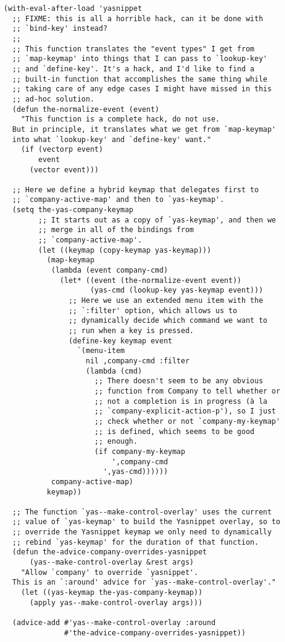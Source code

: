 \documentclass[11pt]{article}
\begin{document}
\begin{verbatim}
(with-eval-after-load 'yasnippet
  ;; FIXME: this is all a horrible hack, can it be done with
  ;; `bind-key' instead?
  ;;
  ;; This function translates the "event types" I get from
  ;; `map-keymap' into things that I can pass to `lookup-key'
  ;; and `define-key'. It's a hack, and I'd like to find a
  ;; built-in function that accomplishes the same thing while
  ;; taking care of any edge cases I might have missed in this
  ;; ad-hoc solution.
  (defun the-normalize-event (event)
    "This function is a complete hack, do not use.
  But in principle, it translates what we get from `map-keymap'
  into what `lookup-key' and `define-key' want."
    (if (vectorp event)
        event
      (vector event)))

  ;; Here we define a hybrid keymap that delegates first to
  ;; `company-active-map' and then to `yas-keymap'.
  (setq the-yas-company-keymap
        ;; It starts out as a copy of `yas-keymap', and then we
        ;; merge in all of the bindings from
        ;; `company-active-map'.
        (let ((keymap (copy-keymap yas-keymap)))
          (map-keymap
           (lambda (event company-cmd)
             (let* ((event (the-normalize-event event))
                    (yas-cmd (lookup-key yas-keymap event)))
               ;; Here we use an extended menu item with the
               ;; `:filter' option, which allows us to
               ;; dynamically decide which command we want to
               ;; run when a key is pressed.
               (define-key keymap event
                 `(menu-item
                   nil ,company-cmd :filter
                   (lambda (cmd)
                     ;; There doesn't seem to be any obvious
                     ;; function from Company to tell whether or
                     ;; not a completion is in progress (à la
                     ;; `company-explicit-action-p'), so I just
                     ;; check whether or not `company-my-keymap'
                     ;; is defined, which seems to be good
                     ;; enough.
                     (if company-my-keymap
                         ',company-cmd
                       ',yas-cmd))))))
           company-active-map)
          keymap))

  ;; The function `yas--make-control-overlay' uses the current
  ;; value of `yas-keymap' to build the Yasnippet overlay, so to
  ;; override the Yasnippet keymap we only need to dynamically
  ;; rebind `yas-keymap' for the duration of that function.
  (defun the-advice-company-overrides-yasnippet
      (yas--make-control-overlay &rest args)
    "Allow `company' to override `yasnippet'.
  This is an `:around' advice for `yas--make-control-overlay'."
    (let ((yas-keymap the-yas-company-keymap))
      (apply yas--make-control-overlay args)))

  (advice-add #'yas--make-control-overlay :around
              #'the-advice-company-overrides-yasnippet))
\end{verbatim}
\end{document}
